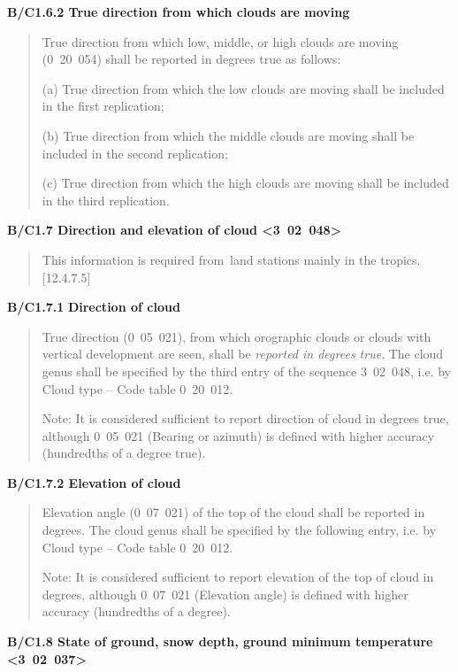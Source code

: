 \textbf{B/C1.6.2 True direction from which clouds are moving}

\begin{quote}
True direction from which low, middle, or high clouds are moving (0\emph{~}20~054) shall be reported in degrees true as follows:

(a) True direction from which the low clouds are moving shall be included in the first replication;

(b) True direction from which the middle clouds are moving shall be included in the second replication;

(c) True direction from which the high clouds are moving shall be included in the third replication.
\end{quote}

\textbf{B/C1.7 Direction and elevation of cloud \textless3\emph{~}02\emph{~}048\textgreater{}}

\begin{quote}
This information is required from~land stations mainly in the tropics. {[}12.4.7.5{]}
\end{quote}

\textbf{B/C1.7.1} \textbf{Direction of cloud}

\begin{quote}
True direction (0~05~021), from which orographic clouds or clouds with vertical development are seen, shall be \emph{reported in degrees true}. The cloud genus shall be specified by the third entry of the sequence 3\emph{~}02~048, i.e. by Cloud type -- Code table 0~20~012.

Note: It is considered sufficient to report direction of cloud in degrees true, although 0~05~021 (Bearing or azimuth) is defined with higher accuracy (hundredths of a degree true).
\end{quote}

\textbf{B/C1.7.2 Elevation of cloud}

\begin{quote}
Elevation angle (0~07~021) of the top of the cloud shall be reported in degrees. The cloud genus shall be specified by the following entry, i.e. by Cloud type -- Code table 0~20~012.

Note: It is considered sufficient to report elevation of the top of cloud in degrees, although 0~07~021 (Elevation angle) is defined with higher accuracy (hundredths of a degree).
\end{quote}

\textbf{B/C1.8 State of ground, snow depth, ground minimum temperature \textless3\emph{~}02\emph{~}037\textgreater{}}


